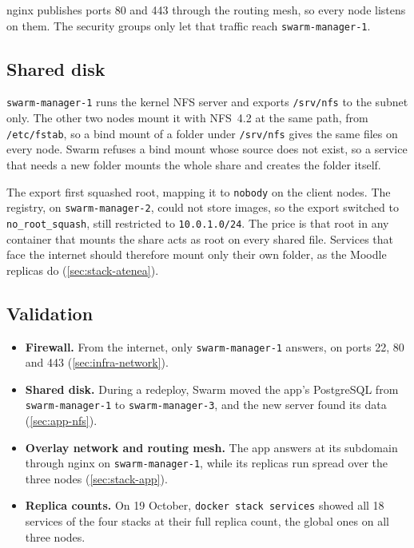 nginx publishes ports 80 and 443 through the routing mesh, so every node
listens on them. The security groups only let that traffic reach
\texttt{swarm-manager-1}.

\subsection{Shared disk}

\texttt{swarm-manager-1} runs the kernel NFS server and exports
\texttt{/srv/nfs} to the subnet only. The other two nodes mount it with
NFS~4.2 at the same path, from \texttt{/etc/fstab}, so a bind mount of a
folder under \texttt{/srv/nfs} gives the same files on every node. Swarm
refuses a bind mount whose source does not exist, so a service that
needs a new folder mounts the whole share and creates the folder itself.

The export first squashed root, mapping it to \texttt{nobody} on the
client nodes. The registry, on \texttt{swarm-manager-2}, could not store
images, so the export switched to \texttt{no\_root\_squash}, still
restricted to \texttt{10.0.1.0/24}. The price is that root in any
container that mounts the share acts as root on every shared file.
Services that face the internet should therefore mount only their own
folder, as the Moodle replicas do (\cref{sec:stack-atenea}).

\subsection{Validation}

\begin{itemize}
  \item \textbf{Firewall.} From the internet, only
        \texttt{swarm-manager-1} answers, on ports 22, 80 and 443
        (\cref{sec:infra-network}).
  \item \textbf{Shared disk.} During a redeploy, Swarm moved the app's
        PostgreSQL from \texttt{swarm-manager-1} to
        \texttt{swarm-manager-3}, and the new server found its data
        (\cref{sec:app-nfs}).
  \item \textbf{Overlay network and routing mesh.} The app answers at its
        subdomain through nginx on \texttt{swarm-manager-1}, while its
        replicas run spread over the three nodes (\cref{sec:stack-app}).
  \item \textbf{Replica counts.} On 19 October,
        \texttt{docker stack services} showed all 18 services of the four
        stacks at their full replica count, the global ones on all three
        nodes.
\end{itemize}
